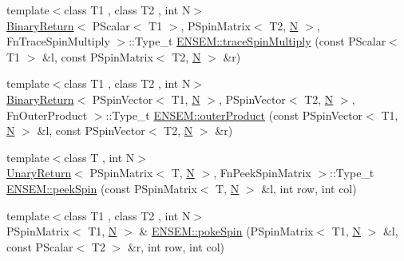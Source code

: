 \begin{DoxyCompactItemize}
\item 
{\footnotesize template$<$class T1 , class T2 , int N$>$ }\\\mbox{\hyperlink{structBinaryReturn}{Binary\+Return}}$<$ P\+Scalar$<$ T1 $>$, P\+Spin\+Matrix$<$ T2, \mbox{\hyperlink{adat__devel_2lib_2hadron_2operator__name__util_8cc_a7722c8ecbb62d99aee7ce68b1752f337}{N}} $>$, Fn\+Trace\+Spin\+Multiply $>$\+::Type\+\_\+t \mbox{\hyperlink{group__primspinmatrix_ga2dc2ab87ff63abab3c74a0a1f1dd3d09}{E\+N\+S\+E\+M\+::trace\+Spin\+Multiply}} (const P\+Scalar$<$ T1 $>$ \&l, const P\+Spin\+Matrix$<$ T2, \mbox{\hyperlink{adat__devel_2lib_2hadron_2operator__name__util_8cc_a7722c8ecbb62d99aee7ce68b1752f337}{N}} $>$ \&r)
\item 
{\footnotesize template$<$class T1 , class T2 , int N$>$ }\\\mbox{\hyperlink{structBinaryReturn}{Binary\+Return}}$<$ P\+Spin\+Vector$<$ T1, \mbox{\hyperlink{adat__devel_2lib_2hadron_2operator__name__util_8cc_a7722c8ecbb62d99aee7ce68b1752f337}{N}} $>$, P\+Spin\+Vector$<$ T2, \mbox{\hyperlink{adat__devel_2lib_2hadron_2operator__name__util_8cc_a7722c8ecbb62d99aee7ce68b1752f337}{N}} $>$, Fn\+Outer\+Product $>$\+::Type\+\_\+t \mbox{\hyperlink{group__primspinmatrix_ga6ff39d20fc8369664c9b3849e00d654d}{E\+N\+S\+E\+M\+::outer\+Product}} (const P\+Spin\+Vector$<$ T1, \mbox{\hyperlink{adat__devel_2lib_2hadron_2operator__name__util_8cc_a7722c8ecbb62d99aee7ce68b1752f337}{N}} $>$ \&l, const P\+Spin\+Vector$<$ T2, \mbox{\hyperlink{adat__devel_2lib_2hadron_2operator__name__util_8cc_a7722c8ecbb62d99aee7ce68b1752f337}{N}} $>$ \&r)
\item 
{\footnotesize template$<$class T , int N$>$ }\\\mbox{\hyperlink{structUnaryReturn}{Unary\+Return}}$<$ P\+Spin\+Matrix$<$ T, \mbox{\hyperlink{adat__devel_2lib_2hadron_2operator__name__util_8cc_a7722c8ecbb62d99aee7ce68b1752f337}{N}} $>$, Fn\+Peek\+Spin\+Matrix $>$\+::Type\+\_\+t \mbox{\hyperlink{group__primspinmatrix_ga2af6db806ff17a39ca84960a216d33c7}{E\+N\+S\+E\+M\+::peek\+Spin}} (const P\+Spin\+Matrix$<$ T, \mbox{\hyperlink{adat__devel_2lib_2hadron_2operator__name__util_8cc_a7722c8ecbb62d99aee7ce68b1752f337}{N}} $>$ \&l, int row, int col)
\item 
{\footnotesize template$<$class T1 , class T2 , int N$>$ }\\P\+Spin\+Matrix$<$ T1, \mbox{\hyperlink{adat__devel_2lib_2hadron_2operator__name__util_8cc_a7722c8ecbb62d99aee7ce68b1752f337}{N}} $>$ \& \mbox{\hyperlink{group__primspinmatrix_ga79a215ef6e9982decb24addd77e93dae}{E\+N\+S\+E\+M\+::poke\+Spin}} (P\+Spin\+Matrix$<$ T1, \mbox{\hyperlink{adat__devel_2lib_2hadron_2operator__name__util_8cc_a7722c8ecbb62d99aee7ce68b1752f337}{N}} $>$ \&l, const P\+Scalar$<$ T2 $>$ \&r, int row, int col)

\end{DoxyCompactItemize}
